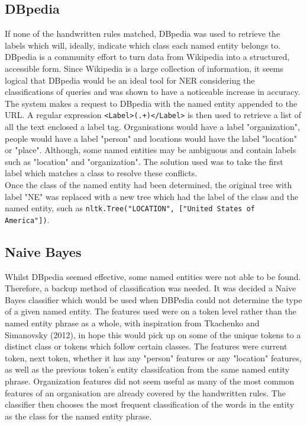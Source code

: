 \documentclass[10pt]{article}
\begin{document}
\begin{multicols}{2}
\subsection{DBpedia}
If none of the handwritten rules matched, DBpedia was used to retrieve the labels which will, ideally, indicate which class each named entity belongs to. DBpedia is a community effort to turn data from Wikipedia into a structured, accessible form. Since Wikipedia is a large collection of information, it seems logical that DBpedia would be an ideal tool for NER considering the classifications of queries and was shown to have a noticeable increase in accuracy\cite{features}.\\The system makes a request to DBpedia with the named entity appended to the URL\cite{dbpediaexample}. A regular expression {{\tt <Label>(.+)</Label>}} is then used to retrieve a list of all the text enclosed a label tag. Organisations would have a label "organization", people would have a label "person" and locations would have the label "location" or "place". Although, some named entities may be ambiguous and contain labels such as "location" and "organization". The solution used was to take the first label which matches a class to resolve these conflicts.\\
Once the class of the named entity had been determined, the original tree with label "NE" was replaced with a new tree which had the label of the class and the named entity, such as {{\tt nltk.Tree("LOCATION", ["United States of America"])}}.
\subsection{Naive Bayes}
Whilst DBpedia seemed effective, some named entities were not able to be found. Therefore, a backup method of classification was needed. It was decided a Naive Bayes classifier which would be used when DBPedia could not determine the type of a given named entity. The features used were on a token level rather than the named entity phrase as a whole, with inspiration from Tkachenko and Simanovsky (2012)\cite{features}, in hope this would pick up on some of the unique tokens to a distinct class or tokens which follow certain classes. The features were current token, next token, whether it has any "person" features or any "location" features, as well as the previous token's entity classifcation from the same named entity phrase. Organization features did not seem useful as many of the most common features of an organisation are already covered by the handwritten rules. The classifier then chooses the most frequent classification of the words in the entity as the class for the named entity phrase.


\end{multicols}
\end{document}

